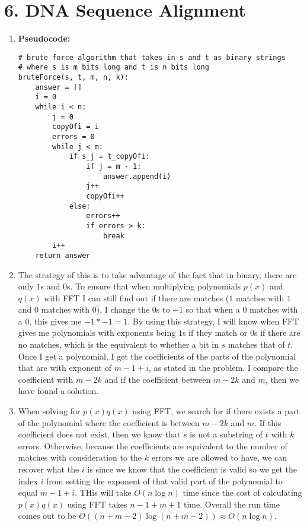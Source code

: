 \documentclass[11pt]{article}
\newenvironment{pseudocode}{\par{\bf Pseudocode:}}{\smallskip}
\begin{document}
\section*{6. DNA Sequence Alignment}
\begin{enumerate}[label=(\alph*)]
\item
\begin{pseudocode}
\begin{lstlisting}
# brute force algorithm that takes in s and t as binary strings
# where s is m bits long and t is n bits long
bruteForce(s, t, m, n, k):
	answer = []
	i = 0
	while i < n:
		j = 0
		copyOfi = i
		errors = 0
		while j < m:
			if s_j = t_copyOfi:
				if j = m - 1:
					answer.append(i)
				j++
				copyOfi++
			else:
				errors++
				if errors > k:
					break
		i++
	return answer
\end{lstlisting}
\end{pseudocode}

\item
The strategy of this is to take advantage of the fact that in binary, there are only $1$s and $0$s. To ensure that when multiplying polynomials $p(x)$ and $q(x)$ with FFT I can still find out if there are matches ($1$ matches with $1$ and $0$ matches with $0$), I change the $0$s to $-1$ so that when a $0$ matches with a $0$, this gives me $-1 * -1 = 1$. By using this strategy, I will know when FFT gives me polynomials with exponents being $1$s if they match or $0$s if there are no matches, which is the equivalent to whether a bit in $s$ matches that of $t$. Once I get a polynomial, I get the coefficients of the parts of the polynomial that are with exponent of $m - 1 + i$, as stated in the problem. I compare the coefficient with $m - 2k$ and if the coefficient between $m - 2k$ and $m$, then we have found a solution.

\item
When solving for $p(x)q(x)$ using FFT, we search for if there exists a part of the polynomial where the coefficient is between $m - 2k$ and $m$. If this coefficient does not exist, then we know that $s$ is not a substring of $t$ with $k$ errors. Otherwise, because the coefficients are equivalent to the number of matches with consideration to the $k$ errors we are allowed to have, we can recover what the $i$ is since we know that the coefficient is valid so we get the index $i$ from setting the exponent of that valid part of the polynomial to equal $m - 1 + i$. THis will take $O(n\log{n})$ time since the cost of calculating $p(x)q(x)$ using FFT takes $n - 1 + m + 1$ time. Overall the run time comes out to be $O((n + m - 2)\log{(n + m - 2)}) \approx O(n\log{n})$.


\end{enumerate}
\end{document}
